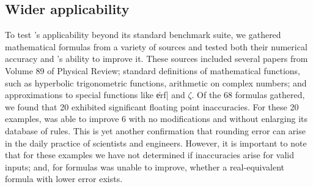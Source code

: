\documentclass[paper.tex]{subfiles}
\begin{document}
\subsection{Wider applicability}

To test \casio's applicability beyond its standard benchmark suite,
  we gathered mathematical formulas from a variety of sources
  and tested both their numerical accuracy
  and \casio's ability to improve it.
These sources included several papers from Volume 89 of Physical Review;
  standard definitions of mathematical functions,
  such as hyperbolic trigonometric functions,
  arithmetic on complex numbers;
  and approximations to special functions like \|erf| and $\zeta$.
Of the 68 formulas gathered, we found that
  20 exhibited significant floating point inaccuracies.
For these 20 examples, \casio was able to improve 6
  with no modifications and without enlarging its database of rules.
This is yet another confirmation
  that rounding error can arise in the daily practice of scientists and engineers.
However, it is important to note that for these examples
  we have not determined if inaccuracies arise for valid inputs;
  and, for formulas \casio was unable to improve,
  whether a real-equivalent formula with lower error exists.
\end{document}
